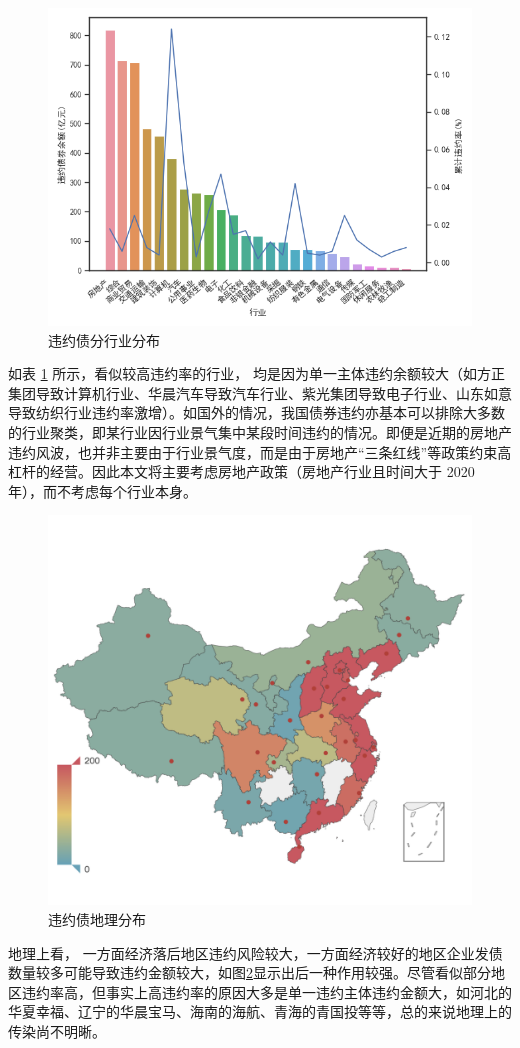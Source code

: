 \begin{figure}[h]
	\centering
	\includegraphics[width=.9\linewidth]{./data/industry.png}
	\caption{\label{fig:industry}违约债分行业分布}
\end{figure}

如表 \ref{fig:industry} 所示，看似较高违约率的行业，
均是因为单一主体违约余额较大（如方正集团导致计算机行业、华晨汽车导致汽车行业、紫光集团导致电子行业、山东如意导致纺织行业违约率激增）。如国外的情况\cite{azizpour2018exploring}，我国债券违约亦基本可以排除大多数的行业聚类，即某行业因行业景气集中某段时间违约的情况。即便是近期的房地产违约风波，也并非主要由于行业景气度，而是由于房地产“三条红线”等政策约束高杠杆的经营。因此本文将主要考虑房地产政策（房地产行业且时间大于 2020 年），而不考虑每个行业本身。

\begin{figure}[h]
	\centering
	\includegraphics[width=.9\linewidth]{./data/default_by_geo.png}
	\caption{\label{fig:geo}违约债地理分布}
\end{figure}
地理上看，
一方面经济落后地区违约风险较大，一方面经济较好的地区企业发债数量较多可能导致违约金额较大，如图\ref{fig:geo}显示出后一种作用较强。尽管看似部分地区违约率高，但事实上高违约率的原因大多是单一违约主体违约金额大，如河北的华夏幸福、辽宁的华晨宝马、海南的海航、青海的青国投等等，总的来说地理上的传染尚不明晰。

